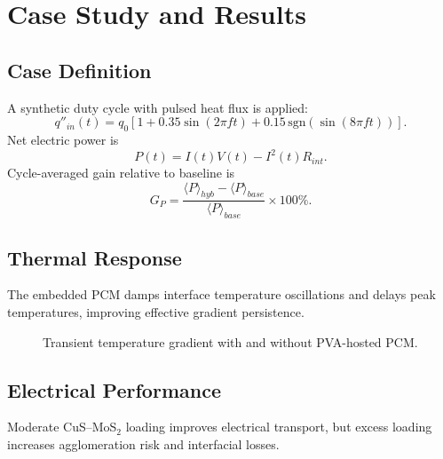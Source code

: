 \chapter{Case Study and Results}\label{ch:case}

\section{Case Definition}
A synthetic duty cycle with pulsed heat flux is applied:
\begin{equation}\label{eq:heat_pulse}
q''_{in}(t)=q_0\left[1+0.35\sin\left(2\pi f t\right)+0.15\,\mathrm{sgn}\left(\sin(8\pi f t)\right)\right].
\end{equation}
Net electric power is
\begin{equation}\label{eq:power_output}
P(t)=I(t)V(t)-I^2(t)R_{int}.
\end{equation}
Cycle-averaged gain relative to baseline is
\begin{equation}\label{eq:gain_metric}
G_P=\frac{\langle P\rangle_{hyb}-\langle P\rangle_{base}}{\langle P\rangle_{base}}\times100\%.
\end{equation}

\section{Thermal Response}
The embedded PCM damps interface temperature oscillations and delays peak temperatures, improving effective gradient persistence.

\begin{figure}[htbp]
\centering
{}
\caption{Transient temperature gradient with and without PVA-hosted PCM.}
\label{fig:case_deltaT}
\end{figure}

\section{Electrical Performance}
Moderate CuS--MoS$_2$ loading improves electrical transport, but excess loading increases agglomeration risk and interfacial losses.


